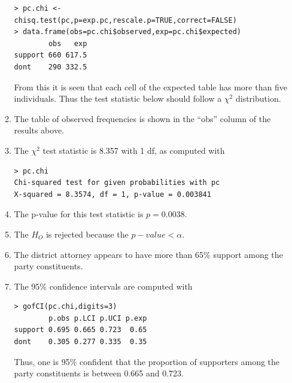 \documentclass[10pt,openany]{book}\usepackage[]{graphicx}\usepackage[]{color}
\makeatletter
\newenvironment{kframe}{%
 \def\at@end@of@kframe{}%
 \ifinner\ifhmode%
  \def\at@end@of@kframe{\end{minipage}}%
  \begin{minipage}{\columnwidth}%
 \fi\fi%
 \def\FrameCommand##1{\hskip\@totalleftmargin \hskip-\fboxsep
 \colorbox{shadecolor}{##1}\hskip-\fboxsep
     \hskip-\linewidth \hskip-\@totalleftmargin \hskip\columnwidth}%
 \MakeFramed {\advance\hsize-\width
   \@totalleftmargin\z@ \linewidth\hsize
   \@setminipage}}%
 {\par\unskip\endMakeFramed%
 \at@end@of@kframe}
\newenvironment{knitrout}{}{} %
\makeatother
\begin{document}
\begin{itemize}
\begin{enumerate}
\begin{knitrout}
\color{fgcolor}\begin{kframe}
\begin{verbatim}
> pc.chi <- chisq.test(pc,p=exp.pc,rescale.p=TRUE,correct=FALSE)
> data.frame(obs=pc.chi$observed,exp=pc.chi$expected)
        obs   exp
support 660 617.5
dont    290 332.5
\end{verbatim}
\end{kframe}
\end{knitrout}
From this it is seen that each cell of the expected table has more than five individuals.  Thus the test statistic below should follow a $\chi^{2}$ distribution.
      \item The table of observed frequencies is shown in the ``obs'' column of the results above.
      \item The $\chi^{2}$ test statistic is 8.357 with 1 df, as computed with
\begin{knitrout}
\color{fgcolor}\begin{kframe}
\begin{verbatim}
> pc.chi
Chi-squared test for given probabilities with pc 
X-squared = 8.3574, df = 1, p-value = 0.003841
\end{verbatim}
\end{kframe}
\end{knitrout}
      \item The p-value for this test statistic is $p=0.0038$.
      \item The $H_{O}$ is rejected because the $p-value<\alpha$.
      \item The district attorney appears to have more than 65\% support among the party constituents.
      \item The 95\% confidence intervals are computed with
\begin{knitrout}
\color{fgcolor}\begin{kframe}
\begin{verbatim}
> gofCI(pc.chi,digits=3)
        p.obs p.LCI p.UCI p.exp
support 0.695 0.665 0.723  0.65
dont    0.305 0.277 0.335  0.35
\end{verbatim}
\end{kframe}
\end{knitrout}
Thus, one is 95\% confident that the proportion of supporters among the party constituents is between 0.665 and 0.723.
    \end{enumerate}

\end{itemize}
\end{document}
